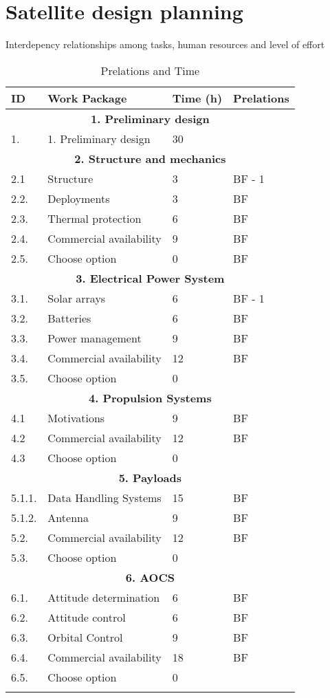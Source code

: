 \section{Satellite design planning}
Interdepency relationships among tasks, human resources and level of effort

\begin{longtable}{ | p{1.3cm} | p{7cm} | p{3cm} | p{3.5cm} |}
	\hline
	
	\textbf{ID }& \textbf{Work Package} & \textbf{Time (h)} & \textbf{Prelations} \\ \hline
	\multicolumn{4}{|c|}{\textbf{1. Preliminary design}} \\ \hline
	1. & 1.	Preliminary design & 30 &   \\ \hline
	\multicolumn{4}{|c|}{\textbf{2. Structure and mechanics}} \\ \hline
	2.1 & Structure & 3 & BF - 1 \\ \hline
	2.2. & Deployments & 3 & BF \\ \hline
	2.3. & Thermal protection & 6 & BF \\ \hline
	2.4. & Commercial availability & 9 & BF \\ \hline
	2.5. & Choose option & 0 & BF \\ \hline
	\multicolumn{4}{|c|}{\textbf{3. Electrical Power System}} \\ \hline
	3.1. & Solar arrays & 6 & BF - 1 \\ \hline
	3.2. & Batteries & 6 & BF \\ \hline
	3.3. & Power management & 9 & BF \\ \hline
	3.4. & Commercial availability & 12 & BF\\ \hline
	3.5. & Choose option & 0 & \\ \hline
	\multicolumn{4}{|c|}{\textbf{4. Propulsion Systems}} \\ \hline
	4.1 & Motivations & 9 & BF  \\ \hline
	4.2 & Commercial availability & 12 & BF  \\ \hline
	4.3 & Choose option & 0 &   \\ \hline
	\multicolumn{4}{|c|}{\textbf{5. Payloads}} \\ \hline
	5.1.1. & Data Handling Systems & 15 & BF \\ \hline
	5.1.2. & Antenna & 9 & BF \\ \hline
	5.2. & Commercial availability & 12 & BF  \\ \hline
	5.3. & Choose option &0& \\ \hline
	\multicolumn{4}{|c|}{\textbf{6. AOCS}} \\ \hline
	6.1. & Attitude determination& 6 & BF  \\ \hline
	6.2. & Attitude control & 6 & BF\\ \hline
	6.3. & Orbital Control & 9 & BF \\ \hline
	6.4. & Commercial availability  & 18 & BF \\ \hline
	6.5. & Choose option & 0 &  \\ \hline
	\caption{Prelations and Time} \\
\end{longtable}